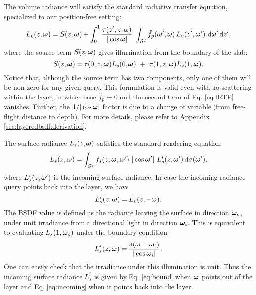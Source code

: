 The volume radiance will satisfy the standard radiative transfer equation, specialized to our position-free setting:
\begin{equation}
\label{eq:IRTE}
L_v(z, \bm{\omega}) = S(z, \bm{\omega}) + 
\int_0^1 \frac{\tau(z', z, \bm{\omega})}{|\cos\bm{\omega}|} \, \, \int_{{\mathcal S^2}} \hat f_p(\bm{\omega}', \bm{\omega}) \, L_v(z', \bm{\omega}') \,\,\mathrm{d} \bm{\omega}' \,\mathrm{d} z',
\end{equation}
where the source term $S(z, \bm{\omega})$ gives illumination from the boundary of the slab:
\begin{equation}
S(z, \bom) = \tau(0, z, \bom) L_s(0, \bom) \ + \ \tau(1, z, \bom) L_s(1, \bom).
\end{equation}
Notice that, although the source term has two components, only one of them will be non-zero for any given query.
This formulation is valid even with no scattering within the layer, in which case $\hat f_p = 0$ and the second term of Eq. \eqref{eq:IRTE} vanishes.
Further, the $1/|\cos\bm{\omega}|$ factor is due to a change of variable (from free-flight distance to depth). For more details, please refer to Appendix \ref{sec:layeredbsdf:derivation}.

The surface radiance $L_s(z, \bm{\omega})$ satisfies the standard rendering equation:
\begin{equation}
\label{eq:RE}
L_s(z, \bm{\omega}) = \int_{{\mathcal S^2}} f_s(z, \bm{\omega}, \bm{\omega}') \ |\cos \bm{\omega}'| \ L_s^i(z, \bm{\omega}') \,\mathrm{d} \sigma(\bm{\omega}'),
\end{equation}
where $L_s^i(z, \bm{\omega}')$ is the incoming surface radiance. In case the incoming radiance query points back into the layer, we have
\begin{equation}
\label{eq:incoming}
L_s^i(z, \bm{\omega}) = L_v(z, -\bm{\omega}).
\end{equation}
The BSDF value is defined as the radiance leaving the surface in direction $\bm{\omega}_o$, under unit irradiance from a directional light in direction $\bm{\omega}_i$. This is equivalent to evaluating $L_s(1, \bm{\omega}_o)$ under the boundary condition
\begin{equation}
	\label{eq:bound}
	L_s^i(z, \bm{\omega}) = \frac{\delta(\bm{\omega} - \bm{\omega}_i)}{|\cos \bm{\omega}_i|}.
\end{equation}
One can easily check that the irradiance under this illumination is unit. Thus the incoming surface radiance $L^i_s$ is given by Eq. \eqref{eq:bound} when $\bm{\omega}$ points out of the layer and Eq. \eqref{eq:incoming} when it points back into the layer.

